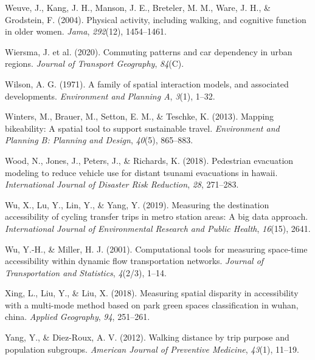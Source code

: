 \documentclass[
11pt, %
oneside, %
english, %
singlespacing, %
]{macthesis} %
\newlength{\cslhangindent}
\newenvironment{CSLReferences}[2] %
 {%
  \setlength{\parindent}{0pt}
  \ifodd #1 \everypar{\setlength{\hangindent}{\cslhangindent}}\ignorespaces\fi
  \ifnum #2 > 0
  \setlength{\parskip}{#2\baselineskip}
  \fi
 }%
 {}
\begin{document}
\begin{CSLReferences}{1}{0}
\leavevmode{}%
Weuve, J., Kang, J. H., Manson, J. E., Breteler, M. M., Ware, J. H., \& Grodstein, F. (2004). Physical activity, including walking, and cognitive function in older women. \emph{Jama}, \emph{292}(12), 1454--1461.

\leavevmode{}%
Wiersma, J. et al. (2020). Commuting patterns and car dependency in urban regions. \emph{Journal of Transport Geography}, \emph{84}(C).

\leavevmode{}%
Wilson, A. G. (1971). A family of spatial interaction models, and associated developments. \emph{Environment and Planning A}, \emph{3}(1), 1--32.

\leavevmode{}%
Winters, M., Brauer, M., Setton, E. M., \& Teschke, K. (2013). Mapping bikeability: A spatial tool to support sustainable travel. \emph{Environment and Planning B: Planning and Design}, \emph{40}(5), 865--883.

\leavevmode{}%
Wood, N., Jones, J., Peters, J., \& Richards, K. (2018). Pedestrian evacuation modeling to reduce vehicle use for distant tsunami evacuations in hawaii. \emph{International Journal of Disaster Risk Reduction}, \emph{28}, 271--283.

\leavevmode{}%
Wu, X., Lu, Y., Lin, Y., \& Yang, Y. (2019). Measuring the destination accessibility of cycling transfer trips in metro station areas: A big data approach. \emph{International Journal of Environmental Research and Public Health}, \emph{16}(15), 2641.

\leavevmode{}%
Wu, Y.-H., \& Miller, H. J. (2001). Computational tools for measuring space-time accessibility within dynamic flow transportation networks. \emph{Journal of Transportation and Statistics}, \emph{4}(2/3), 1--14.

\leavevmode{}%
Xing, L., Liu, Y., \& Liu, X. (2018). Measuring spatial disparity in accessibility with a multi-mode method based on park green spaces classification in wuhan, china. \emph{Applied Geography}, \emph{94}, 251--261.

\leavevmode{}%
Yang, Y., \& Diez-Roux, A. V. (2012). Walking distance by trip purpose and population subgroups. \emph{American Journal of Preventive Medicine}, \emph{43}(1), 11--19.


\end{CSLReferences}
\end{document}
